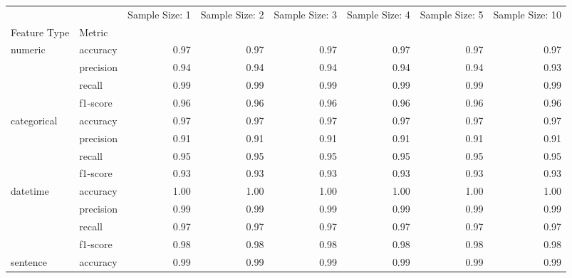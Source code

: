 \begin{tabular}{llrrrrrr}
\toprule
                 &          &  Sample Size: 1 &  Sample Size: 2 &  Sample Size: 3 &  Sample Size: 4 &  Sample Size: 5 &  Sample Size: 10 \\
Feature Type & Metric &                 &                 &                 &                 &                 &                  \\
\midrule
numeric & accuracy &            0.97 &            0.97 &            0.97 &            0.97 &            0.97 &             0.97 \\
                 & precision &            0.94 &            0.94 &            0.94 &            0.94 &            0.94 &             0.93 \\
                 & recall &            0.99 &            0.99 &            0.99 &            0.99 &            0.99 &             0.99 \\
                 & f1-score &            0.96 &            0.96 &            0.96 &            0.96 &            0.96 &             0.96 \\
categorical & accuracy &            0.97 &            0.97 &            0.97 &            0.97 &            0.97 &             0.97 \\
                 & precision &            0.91 &            0.91 &            0.91 &            0.91 &            0.91 &             0.91 \\
                 & recall &            0.95 &            0.95 &            0.95 &            0.95 &            0.95 &             0.95 \\
                 & f1-score &            0.93 &            0.93 &            0.93 &            0.93 &            0.93 &             0.93 \\
datetime & accuracy &            1.00 &            1.00 &            1.00 &            1.00 &            1.00 &             1.00 \\
                 & precision &            0.99 &            0.99 &            0.99 &            0.99 &            0.99 &             0.99 \\
                 & recall &            0.97 &            0.97 &            0.97 &            0.97 &            0.97 &             0.97 \\
                 & f1-score &            0.98 &            0.98 &            0.98 &            0.98 &            0.98 &             0.98 \\
sentence & accuracy &            0.99 &            0.99 &            0.99 &            0.99 &            0.99 &             0.99 \\

\end{tabular}
